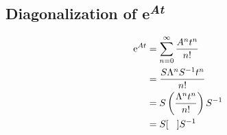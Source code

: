 \documentclass{article}
\newcommand{\e}{\text{e}}
\begin{document}
\subsection*{Diagonalization of e\textsuperscript{\emph{At}}}
\begin{align*}
    \e^{At} &= \sum_{n=0}^\infty \frac{A^nt^n}{n!}\\
    &= \frac{S\Lambda^nS^{-1}t^n}{n!}\\
    &= S\left( \frac{\Lambda^nt^n}{n!} \right)S^{-1}\\
    &= S
    [\hspace{3mm}]
    S^{-1}
\end{align*}
\end{document}
